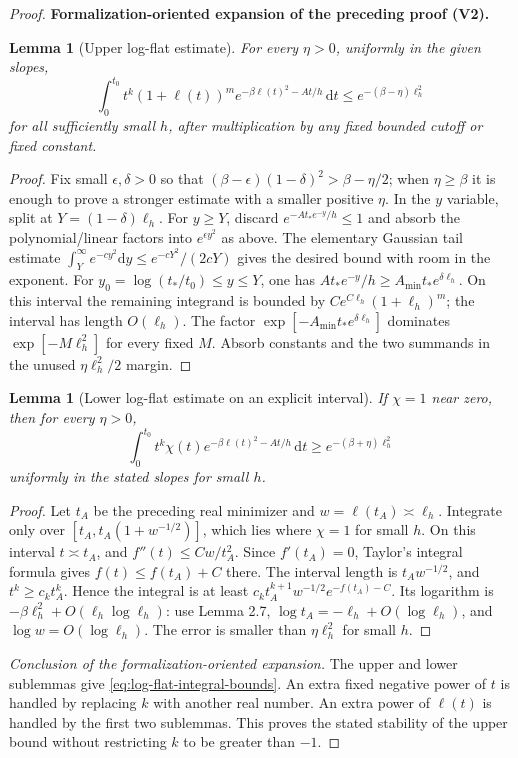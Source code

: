 \documentclass[11pt]{article}
\newtheorem{lemma}[theorem]{Lemma}
\newcommand{\formalisationparentid}{X}
\newenvironment{formalisationaddition}[1]{\par\medskip\begingroup\color{blue}\def\formalisationparentid{#1}\setcounter{formalizationsublemma}{0}\let\lemma\formalizationsublemma\let\endlemma\endformalizationsublemma
  \def\Eo{\mathcal E_h^\circ}\def\EE{\mathcal E_h}\def\phio{\phi_h^\circ}\def\phih{\phi_h}\def\Ho{H_h^{\rm atom}(v^\circ)}\def\Ha{H_h^{\rm atom}}\def\HL{H_h^{L}}\def\Dh{D_h}\def\Log{\operatorname{Log}}\def\ellh{\ell_h}\def\Gp{G_{p,h}}\def\Ast{A_{*,h}}\def\ahat{\widehat{\mathfrak a}_h}\def\ah{\mathfrak a_h}\def\rh{\widehat\rho_h}\def\deltah{\widehat\delta_h}\def\oldref##1{\textup{(##1)}}\def\interface##1{\par\noindent\textit{Analytical interface used here.} ##1\par}\def\finish{\par\noindent\textit{Conclusion of the formalization-oriented expansion.} }\par\noindent\textbf{Formalization-oriented expansion of the preceding proof (V2).}\par\smallskip
}{\par\endgroup\medskip
}
\begin{document}
\begin{proof}
\begin{formalisationaddition}{L2.8}
\begin{lemma}[Upper log-flat estimate]\label{sublemma:L2-8-upper}
For every $\eta>0$, uniformly in the given slopes,
\[
 \int_0^{t_0}t^k(1+\ell(t))^m e^{-\beta\ell(t)^2-At/h}\,\mathrm dt
 \le e^{-(\beta-\eta)\ell_h^2}
\]
for all sufficiently small $h$, after multiplication by any fixed bounded cutoff or fixed constant.
\end{lemma}
\begin{proof}
Fix small $\epsilon,\delta>0$ so that $(\beta-\epsilon)(1-\delta)^2>\beta-\eta/2$; when $\eta\ge\beta$ it is enough to prove a stronger estimate with a smaller positive $\eta$. In the $y$ variable, split at $Y=(1-\delta)\ell_h$.
For $y\ge Y$, discard $e^{-At_*e^{-y}/h}\le1$ and absorb the polynomial/linear factors into $e^{\epsilon y^2}$ as above. The elementary Gaussian tail estimate
$\int_Y^\infty e^{-c y^2}\mathrm dy\le e^{-cY^2}/(2cY)$ gives the desired bound with room in the exponent.
For $y_0=\log(t_*/t_0)\le y\le Y$, one has $At_*e^{-y}/h\ge A_{\min}t_*e^{\delta\ell_h}$. On this interval the remaining integrand is bounded by $C e^{C\ell_h}(1+\ell_h)^m$; the interval has length $O(\ell_h)$. The factor $\exp[-A_{\min}t_*e^{\delta\ell_h}]$ dominates $\exp[-M\ell_h^2]$ for every fixed $M$. Absorb constants and the two summands in the unused $\eta\ell_h^2/2$ margin.
\end{proof}

\begin{lemma}[Lower log-flat estimate on an explicit interval]\label{sublemma:L2-8-lower}
If $\chi=1$ near zero, then for every $\eta>0$,
\[
 \int_0^{t_0}t^k\chi(t)e^{-\beta\ell(t)^2-At/h}\,\mathrm dt
 \ge e^{-(\beta+\eta)\ell_h^2}
\]
uniformly in the stated slopes for small $h$.
\end{lemma}
\begin{proof}
Let $t_A$ be the preceding real minimizer and $w=\ell(t_A)\asymp\ell_h$. Integrate only over
$[t_A,t_A(1+w^{-1/2})]$, which lies where $\chi=1$ for small $h$. On this interval $t\asymp t_A$, and
$f''(t)\le Cw/t_A^2$. Since $f'(t_A)=0$, Taylor's integral formula gives $f(t)\le f(t_A)+C$ there. The interval length is $t_Aw^{-1/2}$, and $t^k\ge c_k t_A^k$. Hence the integral is at least
$c_k t_A^{k+1}w^{-1/2}e^{-f(t_A)-C}$.
Its logarithm is
$-\beta\ell_h^2+O(\ell_h\log\ell_h)$: use Lemma 2.7, $\log t_A=-\ell_h+O(\log\ell_h)$, and $\log w=O(\log\ell_h)$. The error is smaller than $\eta\ell_h^2$ for small $h$.
\end{proof}
\finish The upper and lower sublemmas give \eqref{eq:log-flat-integral-bounds}. An extra fixed negative power of $t$ is handled by replacing $k$ with another real number. An extra power of $\ell(t)$ is handled by the first two sublemmas. This proves the stated stability of the upper bound without restricting $k$ to be greater than $-1$.
\end{formalisationaddition}

\end{proof}
\end{document}
